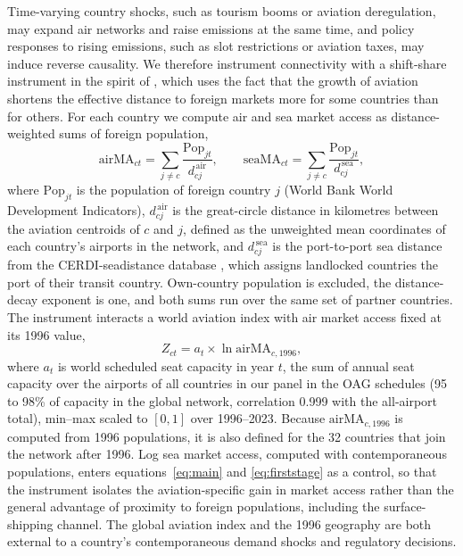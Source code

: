 \documentclass[12pt]{extarticle}
\begin{document}
Time-varying country shocks, such as tourism booms or aviation deregulation, may expand air networks and raise emissions at the same time, and policy responses to rising emissions, such as slot restrictions or aviation taxes, may induce reverse causality. We therefore instrument connectivity with a shift-share instrument in the spirit of \citet{feyrer2019}, which uses the fact that the growth of aviation shortens the effective distance to foreign markets more for some countries than for others. For each country we compute air and sea market access as distance-weighted sums of foreign population,
\begin{equation}
\mathrm{airMA}_{ct}=\sum_{j\neq c}\frac{\mathrm{Pop}_{jt}}{d^{\,\mathrm{air}}_{cj}},
\qquad
\mathrm{seaMA}_{ct}=\sum_{j\neq c}\frac{\mathrm{Pop}_{jt}}{d^{\,\mathrm{sea}}_{cj}},
\label{eq:seama}
\end{equation}
where $\mathrm{Pop}_{jt}$ is the population of foreign country $j$ (World Bank World Development Indicators), $d^{\,\mathrm{air}}_{cj}$ is the great-circle distance in kilometres between the aviation centroids of $c$ and $j$, defined as the unweighted mean coordinates of each country's airports in the network, and $d^{\,\mathrm{sea}}_{cj}$ is the port-to-port sea distance from the CERDI-seadistance database \citep{bertoli2016}, which assigns landlocked countries the port of their transit country. Own-country population is excluded, the distance-decay exponent is one, and both sums run over the same set of partner countries. The instrument interacts a world aviation index with air market access fixed at its 1996 value,
\begin{equation}
Z_{ct}=a_t\times\ln \mathrm{airMA}_{c,1996},
\label{eq:feyrer}
\end{equation}
where $a_t$ is world scheduled seat capacity in year $t$, the sum of annual seat capacity over the airports of all countries in our panel in the OAG schedules (95 to 98\% of capacity in the global network, correlation 0.999 with the all-airport total), min--max scaled to $[0,1]$ over 1996--2023. Because $\mathrm{airMA}_{c,1996}$ is computed from 1996 populations, it is also defined for the 32 countries that join the network after 1996. Log sea market access, computed with contemporaneous populations, enters equations~\ref{eq:main} and \ref{eq:firststage} as a control, so that the instrument isolates the aviation-specific gain in market access rather than the general advantage of proximity to foreign populations, including the surface-shipping channel. The global aviation index and the 1996 geography are both external to a country's contemporaneous demand shocks and regulatory decisions.
\end{document}
